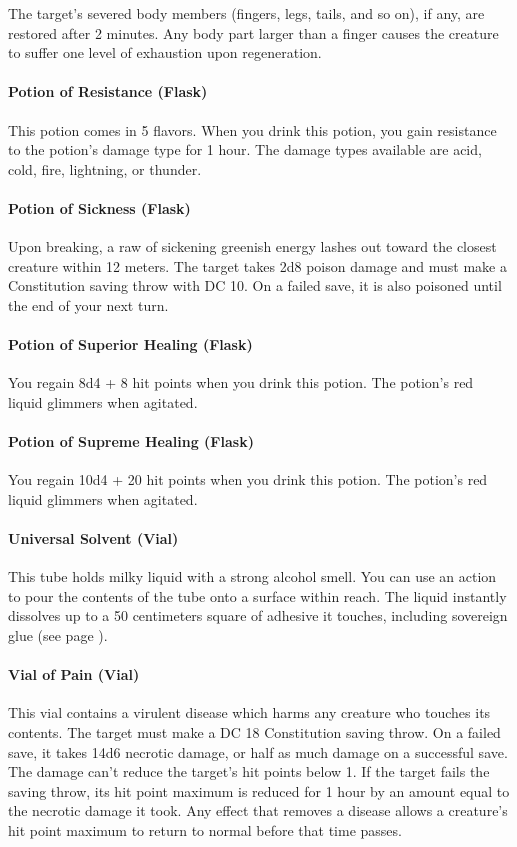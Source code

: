         The target's severed body members (fingers, legs, tails, and so on), if any, are restored after 2 minutes.
        Any body part larger than a finger causes the creature to suffer one level of exhaustion upon regeneration.
    \paragraph{Potion of Resistance (Flask)}
        This potion comes in 5 flavors.
        When you drink this potion, you gain resistance to the potion's damage type for 1 hour.
        The damage types available are acid, cold, fire, lightning, or thunder.
    \paragraph{Potion of Sickness (Flask)} %
        Upon breaking, a raw of sickening greenish energy lashes out toward the closest creature within 12 meters.
        The target takes 2d8 poison damage and must make a Constitution saving throw with DC 10.
        On a failed save, it is also poisoned until the end of your next turn.
    \paragraph{Potion of Superior Healing (Flask)}
        You regain 8d4 + 8 hit points when you drink this potion. The potion's red liquid glimmers when agitated.
    \paragraph{Potion of Supreme Healing (Flask)}
        You regain 10d4 + 20 hit points when you drink this potion.
        The potion's red liquid glimmers when agitated.
    \paragraph{Universal Solvent (Vial)} \label{item::universalsolvent}
        This tube holds milky liquid with a strong alcohol smell.
        You can use an action to pour the contents of the tube onto a surface within reach.
        The liquid instantly dissolves up to a 50 centimeters square of adhesive it touches, including sovereign glue (see page \pageref{item::sovereignglue}).
    \paragraph{Vial of Pain (Vial)} %
        This vial contains a virulent disease which harms any creature who touches its contents.
        The target must make a DC 18 Constitution saving throw.
        On a failed save, it takes 14d6 necrotic damage, or half as much damage on a successful save.
        The damage can't reduce the target's hit points below 1.
        If the target fails the saving throw, its hit point maximum is reduced for 1 hour by an amount equal to the necrotic damage it took.
        Any effect that removes a disease allows a creature's hit point maximum to return to normal before that time passes.
\newpage
